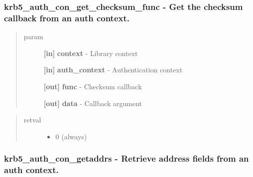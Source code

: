 \documentclass[letterpaper,10pt,english]{sphinxmanual}
\begin{document}
\subsubsection{krb5\_auth\_con\_get\_checksum\_func -  Get the checksum callback from an auth context.}
\label{appdev/refs/api/krb5_auth_con_get_checksum_func::doc}\label{appdev/refs/api/krb5_auth_con_get_checksum_func:krb5-auth-con-get-checksum-func-get-the-checksum-callback-from-an-auth-context}

\begin{fulllineitems}
\label{appdev/refs/api/krb5_auth_con_get_checksum_func:c.krb5_auth_con_get_checksum_func}
\end{fulllineitems}

\begin{quote}\begin{description}
\item[{param}] \leavevmode
\textbf{{[}in{]}} \textbf{context} - Library context

\textbf{{[}in{]}} \textbf{auth\_context} - Authentication context

\textbf{{[}out{]}} \textbf{func} - Checksum callback

\textbf{{[}out{]}} \textbf{data} - Callback argument

\end{description}\end{quote}
\begin{quote}\begin{description}
\item[{retval}] \leavevmode\begin{itemize}
\item {} 
0   (always)

\end{itemize}

\end{description}\end{quote}


\subsubsection{krb5\_auth\_con\_getaddrs -  Retrieve address fields from an auth context.}
\label{appdev/refs/api/krb5_auth_con_getaddrs:krb5-auth-con-getaddrs-retrieve-address-fields-from-an-auth-context}\label{appdev/refs/api/krb5_auth_con_getaddrs::doc}
\end{document}
